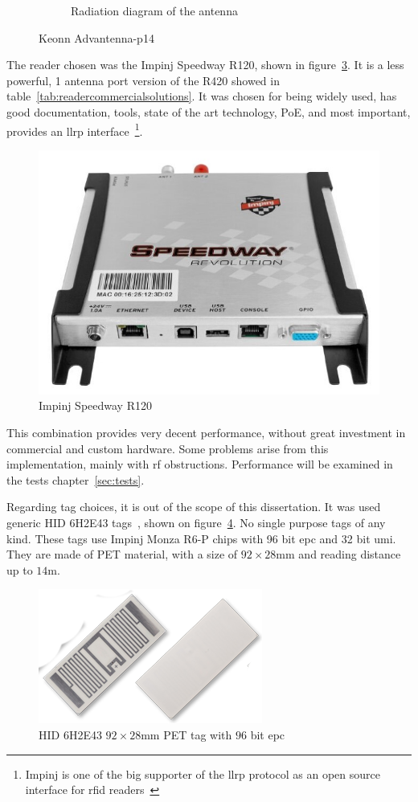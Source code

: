 \begin{figure}
\begin{subfigure}{.45\textwidth}
        \caption{Radiation diagram of the antenna} 
        \label{fig:advantennap14-radiation}
    \end{subfigure}
    \caption{Keonn Advantenna-p14~\cite{Advantennap14RFIDCompact}} 
    \label{fig:antennachoice}
\end{figure}

The reader chosen was the Impinj Speedway R120, shown in figure~\ref{fig:impinjr120}. It is a less powerful, 1 antenna port version of the R420 showed in table~\ref{tab:readercommercialsolutions}. It was chosen for being widely used, has good documentation, tools, state of the art technology, PoE, and most important, provides an \ac{llrp} interface~\footnote{Impinj is one of the big supporter of the \ac{llrp} protocol as an open source interface for \ac{rfid} readers~\cite{SevenRFIDOrganizations}}.

\begin{figure}
    \centering
    \includegraphics[width=0.6\linewidth]{./figs/Speedway_Revolution_R120.jpg}
    \caption{Impinj Speedway R120~\cite{ImpinjSolucoesRAIN}} 
    \label{fig:impinjr120}
\end{figure}

This combination provides very decent performance, without great investment in commercial and custom hardware. Some problems arise from this implementation, mainly with \ac{rf} obstructions. Performance will be examined in the tests chapter~\ref{sec:tests}.  

Regarding tag choices, it is out of the scope of this dissertation. It was used generic HID 6H2E43 tags~\cite{HidetiquetasrfidPdf}, shown on figure~\ref{fig:6H2E43}. No single purpose tags of any kind.
These tags use Impinj Monza R6-P chips with 96 bit \ac{epc} and 32 bit \ac{umi}. They are made of PET material, with a size of $92\times28$mm and reading distance up to $14$m.

\begin{figure}
    \centering
    \includegraphics[width=0.6\linewidth]{./figs/6H2E43.png}
    \caption{HID 6H2E43 $92\times28$mm PET tag with $96$ bit \acs{epc}~\cite{EtusivuIDcontrol}} 
    \label{fig:6H2E43}
\end{figure}

